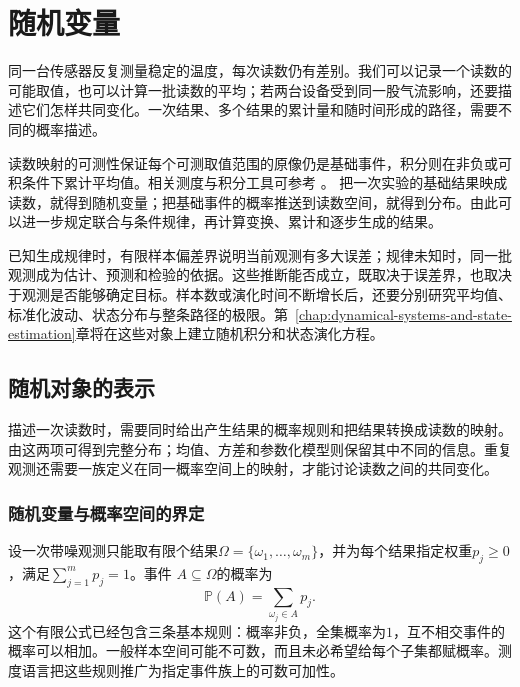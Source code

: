 \chapter{随机变量}
\label{chap:random-variables}
\label{chap:probability-theory}
\label{chap:stochastic-processes-and-approximation}
\label{chap:mathematical-statistics}

同一台传感器反复测量稳定的温度，每次读数仍有差别。我们可以记录一个读数的可能取值，也可以计算一批读数的平均；若两台设备受到同一股气流影响，还要描述它们怎样共同变化。一次结果、多个结果的累计量和随时间形成的路径，需要不同的概率描述。

读数映射的可测性保证每个可测取值范围的原像仍是基础事件，积分则在非负或可积条件下累计平均值。相关测度与积分工具可参考
。
把一次实验的基础结果映成读数，就得到随机变量；把基础事件的概率推送到读数空间，就得到分布。由此可以进一步规定联合与条件规律，再计算变换、累计和逐步生成的结果。

已知生成规律时，有限样本偏差界说明当前观测有多大误差；规律未知时，同一批观测成为估计、预测和检验的依据。这些推断能否成立，既取决于误差界，也取决于观测是否能够确定目标。样本数或演化时间不断增长后，还要分别研究平均值、标准化波动、状态分布与整条路径的极限。第~\ref{chap:dynamical-systems-and-state-estimation}章将在这些对象上建立随机积分和状态演化方程。

\section{随机对象的表示}
\label{sec:rv-definition}
\label{sec:probability-representation-conditioning}
描述一次读数时，需要同时给出产生结果的概率规则和把结果转换成读数的映射。由这两项可得到完整分布；均值、方差和参数化模型则保留其中不同的信息。重复观测还需要一族定义在同一概率空间上的映射，才能讨论读数之间的共同变化。

\subsection{随机变量与概率空间的界定}
\label{sec:probability-spaces-random-variables}
设一次带噪观测只能取有限个结果\(\Omega=\{\omega_1,\ldots,\omega_m\}\)，并为每个结果指定权重\(p_j\geq0\)，满足\(\sum_{j=1}^{m}p_j=1\)。事件
\(A\subseteq\Omega\)的概率为
\[ \mathbb{P}(A)=\sum_{\omega_j\in A}p_j. \]
这个有限公式已经包含三条基本规则：概率非负，全集概率为\(1\)，互不相交事件的概率可以相加。一般样本空间可能不可数，而且未必希望给每个子集都赋概率。测度语言把这些规则推广为指定事件族上的可数可加性。

